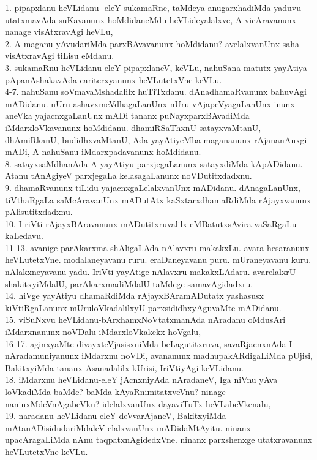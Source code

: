 \documentclass{article}
\begin{document}
1. pipapxlanu heVLidanu- eleY sukamaRne, taMdeya anugarxhadiMda yaduvu utatxmavAda suKavanunx hoMdidaneMdu heVLideyalalxve, A vicAravanunx nanage visAtxravAgi heVLu,\\
2. A maganu yAvudariMda parxBAvavanunx hoMdidanu? avelalxvanUnx saha visAtxravAgi tiLisu eMdanu.\\
3. sukamaRnu heVLidanu-eleY pipapxlaneV, keVLu, nahuSana matutx yayAtiya pApanAshakavAda cariterxyanunx heVLutetxVne keVLu.\\
4-7. nahuSanu soVmavaMshadalilx huTiTxdanu. dAnadhamaRvanunx bahuvAgi mADidanu. nUru ashavxmeVdhagaLanUnx nUru vAjapeVyagaLanUnx inunx aneVka yajacnxgaLanUnx mADi tananx puNayxparxBAvadiMda iMdarxloVkavanunx hoMdidanu. dhamiRSaThxnU satayxvaMtanU, dhAmiRkanU, budidhxvaMtanU, Ada yayAtiyeMba magananunx rAjananAnxgi mADi, A nahuSanu iMdarxpadavanunx hoMdidanu.\\
8. satayxsaMdhanAda A yayAtiyu parxjegaLanunx satayxdiMda kApADidanu. Atanu tAnAgiyeV parxjegaLa kelasagaLanunx noVDutitxdadxnu.\\
9. dhamaRvanunx tiLidu yajacnxgaLelalxvanUnx mADidanu. dAnagaLanUnx, tiVthaRgaLa saMcAravanUnx mADutAtx kaSxtarxdhamaRdiMda rAjayxvanunx pAlisutitxdadxnu.\\
10. I riVti rAjayxBAravanunx mADutitxruvalilx eMBatutxsAvira vaSaRgaLu kaLedavu.\\
11-13. avanige parAkarxma shAligaLAda nAlavxru makakxLu. avara hesaranunx heVLutetxVne. modalaneyavanu ruru. eraDaneyavanu puru. mUraneyavanu kuru. nAlakxneyavanu yadu. IriVti yayAtige nAlavxru makakxLAdaru. avarelalxrU shakitxyiMdalU, parAkarxmadiMdalU taMdege samavAgidadxru.\\
14. hiVge yayAtiyu dhamaRdiMda rAjayxBAramADutatx yashasusx kiVtiRgaLanunx mUruloVkadalilxyU parxsididhxyAguvaMte mADidanu.\\
15. viSuNxvu heVLidanu-bArxhamxNoVtatxmanAda nAradanu oMdusAri iMdarxnanunx noVDalu iMdarxloVkakekx hoVgalu,\\
16-17. aginxyaMte divayxteVjasisxniMda beLagutitxruva, savaRjacnxnAda I nAradamuniyanunx iMdarxnu noVDi, avananunx madhupakARdigaLiMda pUjisi, BakitxyiMda tananx Asanadalilx kUrisi, IriVtiyAgi keVLidanu.\\
18. iMdarxnu heVLidanu-eleY jAcnxniyAda nAradaneV, Iga niVnu yAva loVkadiMda baMde? baMda kAyaRnimitatxveVnu? ninage naninxMdeVnAgabeVku? idelalxvanUnx dayaviTuTx heVLabeVkenalu,\\
19. naradanu heVLidanu eleY deVvarAjaneV, BakitxyiMda mAtanADisidudariMdaleV elalxvanUnx mADidaMtAyitu. ninanx upacAragaLiMda nAnu taqpatxnAgidedxVne. ninanx parxshenxge utatxravanunx heVLutetxVne keVLu.\\
\end{document}
